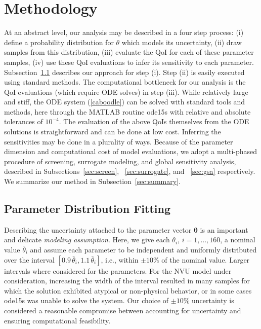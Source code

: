 \section{Methodology}\label{sec:meth}

At an abstract level, our analysis may be described in a four step process: (i) define a probability distribution for $\theta$ which models its uncertainty, (ii) draw samples from this distribution, (iii) evaluate the QoI for each of these parameter samples, (iv) use these QoI evaluations to infer its sensitivity to each parameter. Subsection~\ref{sec:param_dist_fit} describes our approach for step (i). Step (ii) is easily executed using standard methods. The computational bottleneck for our analysis is the QoI evaluations (which require ODE solves) in step (iii). While relatively large and stiff, the ODE system (\ref{caboodle}) can be  solved with standard tools and methods, here through the MATLAB routine ode15s with relative and absolute tolerances of $10^{-4}$. The evaluation of the above QoIs themselves from the ODE solutions is straightforward and can be done at low cost. Inferring the sensitivities may be done in a plurality of ways. Because of the parameter dimension and computational cost of model evaluations, we adopt a multi-phased procedure of screening, surrogate modeling, and global sensitivity analysis, described in Subsections~\ref{sec:screen}, ~\ref{sec:surrogate}, and ~\ref{sec:gsa} respectively. We summarize our method in Subsection~\ref{sec:summary}.

\subsection{Parameter Distribution Fitting}
\label{sec:param_dist_fit}

Describing the uncertainty attached to the parameter vector $\boldsymbol{\theta}$ is an important and delicate {\sl modeling assumption}. Here, we give each $\theta_i$, $i=1,\dots, 160$, a nominal value $\bar \theta_i$ and assume each parameter to be independent and uniformly distributed over the interval $[0.9\, \bar\theta_i, 1.1 \,\bar\theta_i]$, i.e., within $\pm 10\%$ of the nominal value. Larger intervals where considered for the parameters. For the NVU model under consideration, increasing the width of the interval resulted in many samples for which the solution exhibited atypical or non-physical behavior, or in some cases ode15s was unable to solve the system. Our choice of $\pm 10\%$ uncertainty is considered a reasonable compromise between accounting for uncertainty and ensuring computational feasibility. 
	
